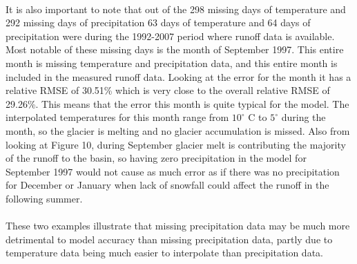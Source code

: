 \documentclass{article}
\begin{document}
\paragraph{}
It is also important to note that out of the 298 missing days of temperature and 292 missing days of precipitation 63 days of temperature and 64 
days of precipitation were during the 1992-2007 period where runoff data is available. Most notable of these missing days is the month of September 
1997. This entire month is missing temperature and precipitation data, and this entire month is included in the measured runoff data. Looking at the 
error for the month it has a relative RMSE of 30.51\% which is very close to the overall relative RMSE of 29.26\%. This 
means that the error this month is quite typical for the model. The interpolated temperatures for this month range from $10^\circ$ C to $5^\circ$ 
during the month, so the glacier is melting and no glacier accumulation is missed. Also from looking at Figure 10, during September glacier melt is 
contributing the majority of the runoff to the basin, so having zero precipitation in the model for September 1997 would not cause as much error as 
if there was no precipitation for December or January when lack of snowfall could affect the runoff in the following summer.
\paragraph{}
These two examples illustrate that missing precipitation data may be much more detrimental to model accuracy than missing precipitation data, partly 
due to temperature data being much easier to interpolate than precipitation data.
\end{document}
